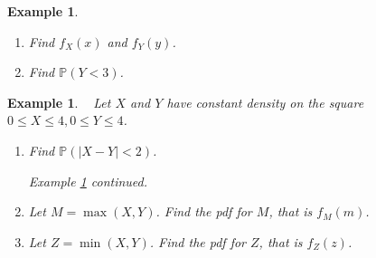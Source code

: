 \documentclass[12pt]{amsart}
\newtheorem{example}[theorem]{Example}
\newcommand\Pbb{\mathbb{P}}
\newcommand\pdfX{f_X(x)}
\newcommand\pdfY{f_Y(y)}
\begin{document}
{\begin{example}
\vspace{.5cm}

\begin{enumerate}
\item Find $\pdfX$ and $\pdfY$.

\vspace{10cm}



\item Find $\Pbb(Y < 3)$.
\vspace{6cm}

\end{enumerate}


\end{example}


\newpage
\begin{example}\label{joint_absolute_diff}\ %
Let $X$ and $Y$ have constant density on the square $0 \leq X \leq 4, 0 \leq Y \leq 4$.

\vspace{.5cm}

\begin{enumerate}
\item Find $\Pbb(|X-Y| < 2)$.


\newpage
\textit{Example \ref{joint_absolute_diff} continued.}

\item Let $M = \max(X,Y)$. Find the pdf for $M$, that is $f_M(m)$.
\vspace{10cm}


\item Let $Z = \min(X,Y)$. Find the pdf for $Z$, that is $f_Z(z)$.

\end{enumerate}


\end{example}




\newpage

}
\end{document}
